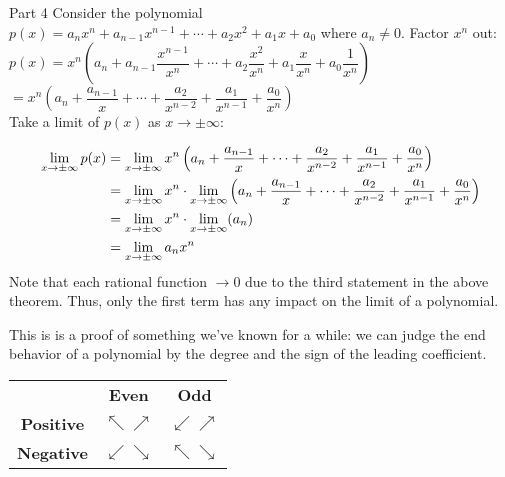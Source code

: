 \begin{prf}{Part 4}
Consider the polynomial $p(x) =a_nx^n+a_{n-1}x^{n-1}+\cdots+a_2x^2+a_1x+a_0$ where $a_n\neq0$. Factor $x^n$ out:\\
$p(x) = x^n\left(a_n+a_{n-1}\dfrac{x^{n-1}}{x^n}+ \cdots + a_2\dfrac{x^2}{x^n} + a_1\dfrac{x}{x^n}+a_0\dfrac{1}{x^n}\right)$\\
$= x^n\left(a_n+\dfrac{a_{n-1}}{x}+ \cdots + \dfrac{a_2}{x^{n-2}} + \dfrac{a_1}{x^{n-1}}+\dfrac{a_0}{x^n}\right)$\\

Take a limit of $p(x)$ as $x\to\pm\infty$:

\begin{align*}
\displaystyle \lim_{x\to\pm\infty}p(x) & = \displaystyle \lim_{x\to\pm\infty} x^n\left(a_n+\dfrac{a_{n-1}}{x}+ \cdots + \dfrac{a_2}{x^{n-2}} + \dfrac{a_1}{x^{n-1}}+\dfrac{a_0}{x^n}\right)\\
&= \displaystyle \lim_{x\to\pm\infty} x^n \cdot \displaystyle \lim_{x\to\pm\infty} \left(a_n+\dfrac{a_{n-1}}{x}+ \cdots + \dfrac{a_2}{x^{n-2}} + \dfrac{a_1}{x^{n-1}}+\dfrac{a_0}{x^n}\right)\\
& =  \displaystyle \lim_{x\to\pm\infty} x^n \cdot \displaystyle \lim_{x\to\pm\infty} (a_n)\\
& = \displaystyle \lim_{x\to\pm\infty} a_n x^n
\end{align*}
Note that each rational function $\to 0$ due to the third statement in the above theorem. Thus, only the first term has any impact on the limit of a polynomial.
\end{prf}

This is is a proof of something we've known for a while: we can judge the end behavior of a polynomial by the degree and the sign of the leading coefficient.
\begin{center}
\begin{tabular}{ccc}
    & \textbf{Even} &   \textbf{Odd}\\
  \textbf{Positive} & $\nwarrow \nearrow$ & $\swarrow \nearrow$\\
  \textbf{Negative} & $\swarrow \searrow$ & $\nwarrow \searrow$
\end{tabular}
\end{center}

